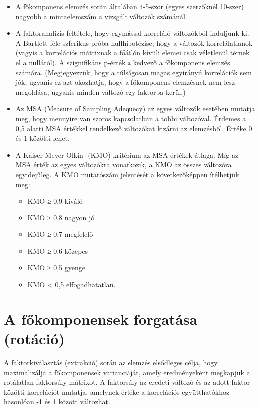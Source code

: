 \documentclass[
  letterpaper,
]{krantz}
\providecommand{\tightlist}{%
  \setlength{\itemsep}{0pt}\setlength{\parskip}{0pt}}\usepackage{longtable,booktabs,array}
\begin{document}
\begin{itemize}
\tightlist
\item
  A főkomponens elemzés során általában 4-5-ször (egyes szerzőknél
  10-szer) nagyobb a mintaelemszám a vizsgált változók számánál.
\item
  A faktoranalízis feltétele, hogy egymással korreláló változókból
  induljunk ki. A Bartlett-féle szferikus próba nullhipotézise, hogy a
  változók korrelálatlanok (vagyis a korrelációs mátrixnak a főátlón
  kívüli elemei csak véletlenül térnek el a nullától). A szignifikáns
  p-érték a kedvező a főkomponens elemzés számára. (Megjegyezzük, hogy a
  túlságosan magas egyirányú korrelációk sem jók, ugyanis ez azt
  okozhatja, hogy a főkomponens elemzésnek nem lesz megoldása, ugyanis
  minden változó egy faktorba kerül.)
\item
  Az MSA (Measure of Sampling Adequecy) az egyes változók esetében
  mutatja meg, hogy mennyire van szoros kapcsolatban a többi változóval.
  Érdemes a 0,5 alatti MSA értékkel rendelkező változókat kizárni az
  elemzésből. Értéke 0 és 1 közötti lehet.
\item
  A Kaiser-Meyer-Olkin- (KMO) kritérium az MSA értékek átlaga. Míg az
  MSA érték az egyes változókra vonatkozik, a KMO az összes változóra
  egyidejűleg. A KMO mutatószám jelentését a következőképpen ítélhetjük
  meg:

  \begin{itemize}
  \tightlist
  \item
    KMO ≥ 0,9 kiváló
  \item
    KMO ≥ 0,8 nagyon jó
  \item
    KMO ≥ 0,7 megfelelő
  \item
    KMO ≥ 0,6 közepes
  \item
    KMO ≥ 0,5 gyenge
  \item
    KMO \textless{} 0,5 elfogadhatatlan.
  \end{itemize}
\end{itemize}

\hypertarget{a-fux151komponensek-forgatuxe1sa-rotuxe1ciuxf3}{%
\section{A főkomponensek forgatása
(rotáció)}\label{a-fux151komponensek-forgatuxe1sa-rotuxe1ciuxf3}}

A faktorkiválasztás (extrakció) során az elemzés elsődleges célja, hogy
maximalizálja a főkomponensek varianciáját, amely eredményeként
megkapjuk a rotálatlan faktorsúly-mátrixot. A faktorsúly az eredeti
változó és az adott faktor közötti korrelációt mutatja, amelynek értéke
a korrelációs együtthatókhoz hasonlóan -1 és 1 között változhat.
\end{document}

